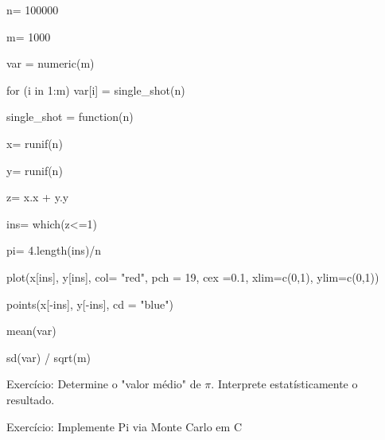 \documentclass[a4paper, 12pt]{article}
\begin{document}
    n= 100000 \newline
    
    m= 1000
    
    var = numeric(m)
    
    for (i in 1:m) var[i] = single\_shot(n)
    
    single\_shot = function(n) \newline
    
    x= runif(n)
    
    y= runif(n)
    
    z= x.x + y.y
    
    ins= which(z<=1)
    
    pi= 4.length(ins)/n \newline
    
    plot(x[ins], y[ins], col= "red", pch = 19, cex =0.1, xlim=c(0,1), ylim=c(0,1))
    
    points(x[-ins], y[-ins], cd = "blue") \newline
    
    mean(var)
    
    sd(var) / sqrt(m) \newline
    
    Exercício: Determine o "valor médio" de $\pi$. Interprete estatísticamente o resultado. \newline
    
    Exercício: Implemente Pi via Monte Carlo em C \newline
    
    
\end{document}
